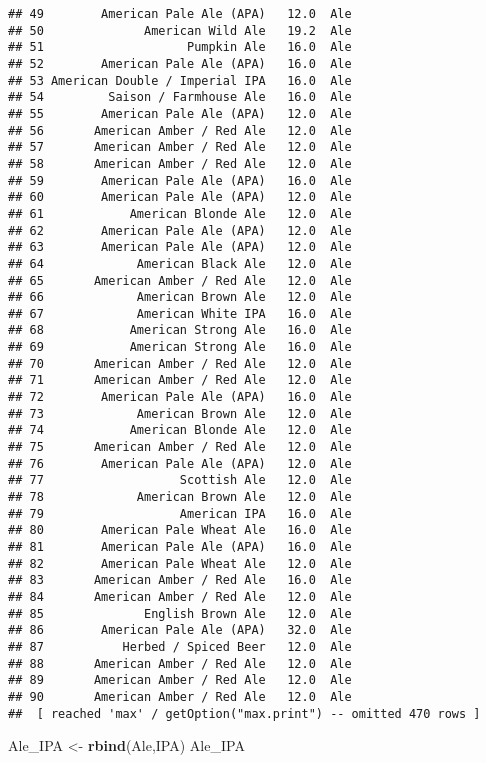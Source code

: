 \documentclass[
]{article}
\newenvironment{Shaded}{\begin{snugshade}}{\end{snugshade}}
\newcommand{\KeywordTok}[1]{\textcolor[rgb]{0.13,0.29,0.53}{\textbf{#1}}}
\newcommand{\NormalTok}[1]{#1}
\newcommand{\StringTok}[1]{\textcolor[rgb]{0.31,0.60,0.02}{#1}}
\begin{document}
\begin{verbatim}
## 49        American Pale Ale (APA)   12.0  Ale
## 50              American Wild Ale   19.2  Ale
## 51                    Pumpkin Ale   16.0  Ale
## 52        American Pale Ale (APA)   16.0  Ale
## 53 American Double / Imperial IPA   16.0  Ale
## 54         Saison / Farmhouse Ale   16.0  Ale
## 55        American Pale Ale (APA)   12.0  Ale
## 56       American Amber / Red Ale   12.0  Ale
## 57       American Amber / Red Ale   12.0  Ale
## 58       American Amber / Red Ale   12.0  Ale
## 59        American Pale Ale (APA)   16.0  Ale
## 60        American Pale Ale (APA)   12.0  Ale
## 61            American Blonde Ale   12.0  Ale
## 62        American Pale Ale (APA)   12.0  Ale
## 63        American Pale Ale (APA)   12.0  Ale
## 64             American Black Ale   12.0  Ale
## 65       American Amber / Red Ale   12.0  Ale
## 66             American Brown Ale   12.0  Ale
## 67             American White IPA   16.0  Ale
## 68            American Strong Ale   16.0  Ale
## 69            American Strong Ale   16.0  Ale
## 70       American Amber / Red Ale   12.0  Ale
## 71       American Amber / Red Ale   12.0  Ale
## 72        American Pale Ale (APA)   16.0  Ale
## 73             American Brown Ale   12.0  Ale
## 74            American Blonde Ale   12.0  Ale
## 75       American Amber / Red Ale   12.0  Ale
## 76        American Pale Ale (APA)   12.0  Ale
## 77                   Scottish Ale   12.0  Ale
## 78             American Brown Ale   12.0  Ale
## 79                   American IPA   16.0  Ale
## 80        American Pale Wheat Ale   16.0  Ale
## 81        American Pale Ale (APA)   16.0  Ale
## 82        American Pale Wheat Ale   12.0  Ale
## 83       American Amber / Red Ale   16.0  Ale
## 84       American Amber / Red Ale   12.0  Ale
## 85              English Brown Ale   12.0  Ale
## 86        American Pale Ale (APA)   32.0  Ale
## 87           Herbed / Spiced Beer   12.0  Ale
## 88       American Amber / Red Ale   12.0  Ale
## 89       American Amber / Red Ale   12.0  Ale
## 90       American Amber / Red Ale   12.0  Ale
##  [ reached 'max' / getOption("max.print") -- omitted 470 rows ]
\end{verbatim}

\begin{Shaded}
\begin{Highlighting}[]
\NormalTok{Ale_IPA <-}\StringTok{ }\KeywordTok{rbind}\NormalTok{(Ale,IPA)}
\NormalTok{Ale_IPA}
\end{Highlighting}
\end{Shaded}
\end{document}
